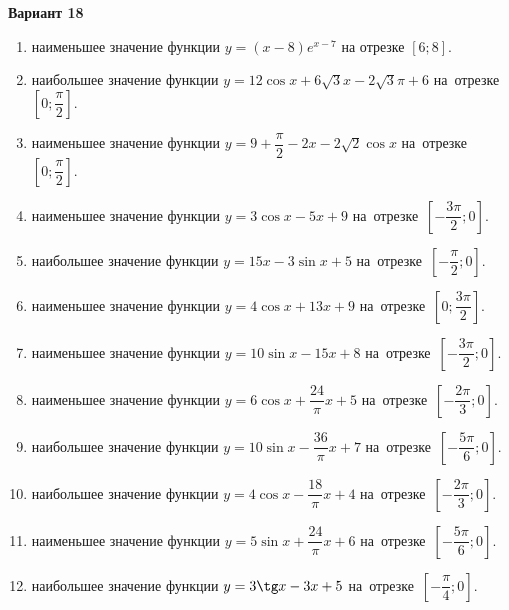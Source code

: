 \documentclass[a4paper,10pt]{article}
\begin{document}
\begin{center}\Large\textbf{Вариант 18}\end{center}

\begin{enumerate}
\item {} наименьшее значение функции $y=\left(x-8\right)e^{x-7}$ на отрезке $\left[6;8\right]$.

\item {} наибольшее значение функции $y=12\cos x+6\sqrt{3} x-2\sqrt{3}\pi +6$ на~отрезке~$\left[0;\dfrac{\pi }{2}\right]$.

\item {} наименьшее значение функции $y=9+\dfrac{\pi }{2}-2x-2\sqrt{2}\cos x$ на~отрезке~$\left[0;\dfrac{\pi }{2}\right]$.

\item {} наименьшее значение функции $y=3\cos x-5x+9$ на~отрезке~$\left[-\dfrac{3\pi }{2};0\right]$.

\item {} наибольшее значение функции $y=15x-3\sin x+5$ на~отрезке~$\left[-\dfrac{\pi }{2};0\right]$.

\item {} наименьшее значение функции $y=4\cos x+13x+9$ на~отрезке~$\left[0;\dfrac{3\pi }{2}\right]$.

\item {} наименьшее значение функции $y=10\sin x-15x+8$ на~отрезке~$\left[-\dfrac{3\pi }{2};0\right]$.

\item {} наименьшее значение функции $y=6\cos x+\dfrac{24}{\pi }x+5$ на~отрезке~$\left[-\dfrac{2\pi }{3};0\right]$.

\item {} наибольшее значение функции $y=10\sin x-\dfrac{36}{\pi }x+7$ на~отрезке~$\left[-\dfrac{5\pi }{6};0\right]$.

\item {} наибольшее значение функции $y=4\cos x-\dfrac{18}{\pi }x+4$ на~отрезке~$\left[-\dfrac{2\pi }{3};0\right]$.

\item {} наименьшее значение функции $y=5\sin x+\dfrac{24}{\pi }x+6$ на~отрезке~$\left[-\dfrac{5\pi }{6};0\right]$.

\item {} наибольшее значение функции $y=3\tg x-3x+5$ на~отрезке~$\left[-\dfrac{\pi }{4};0\right]$.


\end{enumerate}
\end{document}
